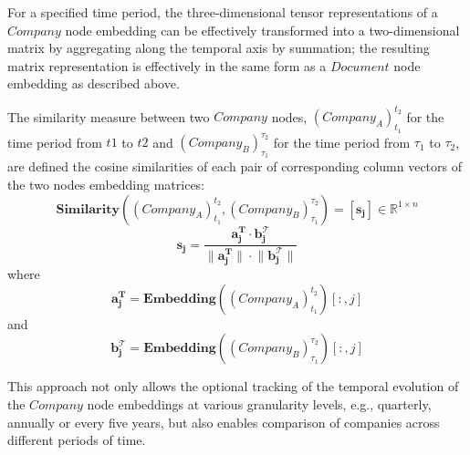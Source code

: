 For a specified time period, the three-dimensional tensor representations of a $Company$ node embedding can be effectively transformed into a two-dimensional matrix by aggregating along the temporal axis by summation; the resulting matrix representation is effectively in the same form as a $Document$ node embedding as described above. 

The similarity measure between two $Company$ nodes, $(Company_A)_{t_1}^{t_2}$ for the time period from $t1$ to $t2$ and $(Company_B)_{\tau_1}^{\tau_2}$ for the time period from ${\tau_1}$ to ${\tau_2}$, are defined the cosine similarities of each pair of corresponding column vectors of the two nodes embedding matrices:
\[ \mathbf{Similarity}((Company_A)_{t_1}^{t_2}, (Company_B)_{\tau_1}^{\tau_2}) = [ \mathbf{s_j} ] \in \mathbb{R}^{1 \times n}\]
\[  \mathbf{s_j} = \frac{\mathbf{a_j^{T} \cdot b_j^{\mathcal{T}}} } {\mathbf{\lVert a_j^{T} \rVert \cdot \lVert b_j^{\mathcal{T}} \rVert}} \] 
where 
\[\mathbf{a_j^{T}} = \textbf{Embedding}((Company_A)_{t_1}^{t_2})[: , j] \] 
and
\[\mathbf{b_j^{\mathcal{T}}} = \textbf{Embedding}((Company_B)_{\tau_1}^{\tau_2})[: , j] \]

This approach not only allows the optional tracking of the temporal evolution of the $Company$ node embeddings at various granularity levels, e.g., quarterly, annually or every five years, but also enables comparison of companies across different periods of time. 
